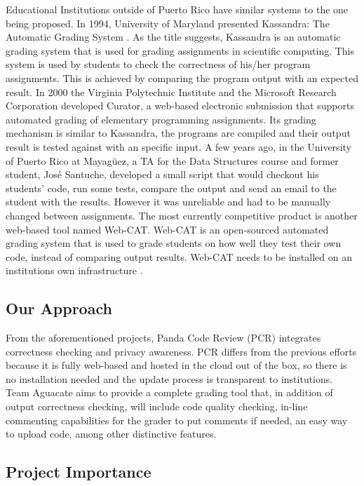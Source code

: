 Educational Institutions outside of Puerto Rico have similar systems to the one
being proposed. In 1994, University of Maryland presented Kassandra: The
Automatic Grading System \cite{Matt1994}. As the title suggests, Kassandra is an
automatic grading system that is used for grading assignments in scientific
computing. This system is used by students to check the correctness of his/her
program assignments. This is achieved by comparing the program output with an
expected result. In 2000 the Virginia Polytechnic Institute and the Microsoft
Research Corporation developed Curator, a web-based electronic submission that
supports automated grading of elementary programming assignments. \cite{Curator}
Its grading mechanism is similar to Kassandra, the programs are compiled and
their output result is tested against with an specific input. A few years ago, in
the University of Puerto Rico at Mayagüez, a TA for the Data Structures course
and former student, José Santuche, developed a small script that would checkout
his students' code, run some tests, compare the output and send an email to the
student with the results. However it was unreliable and had to be manually
changed between assignments. The most currently competitive product is another
web-based tool named Web-CAT. Web-CAT is an open-sourced automated grading
system that is used to grade students on how well they test their own code,
instead of comparing output results. Web-CAT needs to be installed on an
institutions own infrastructure \cite{WebCat}.

\subsection{Our Approach}

From the aforementioned projects, Panda Code Review (PCR) integrates correctness
checking and privacy awareness. PCR differs from the previous efforts because it
is fully web-based and hosted in the cloud out of the box, so there is no
installation needed and the update process is transparent to institutions. Team
Aguacate aims to provide a complete grading tool that, in addition of output
correctness checking, will include code quality checking, in-line commenting
capabilities for the grader to put comments if needed, an easy way to upload
code, among other distinctive features.

\subsection{Project Importance}

